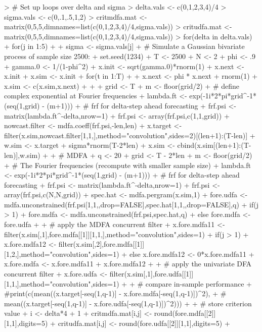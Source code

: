 \documentclass[a4paper]{book}
\begin{document}
\begin{Schunk}
\begin{Sinput}
> # Set up loops over delta and sigma
> delta.vals <- c(0,1,2,3,4)/4
> sigma.vals <- c(0,.1,.5,1,2)
> critmdfa.mat <- matrix(0,5,5,dimnames=list(c(0,1,2,3,4)/4,sigma.vals))
> critudfa.mat <- matrix(0,5,5,dimnames=list(c(0,1,2,3,4)/4,sigma.vals))
> for(delta in delta.vals) {
+ for(j in 1:5) {
+ 
+ sigma <- sigma.vals[j]
+ # Simulate a Gaussian bivariate process of sample size 2500:
+ set.seed(1234)
+ T <- 2500
+ N <- 2
+ phi <- .9
+ gamma.0 <- 1/(1-phi^2)
+ x.init <- sqrt(gamma.0)*rnorm(1)
+ x.next <- x.init
+ x.sim <- x.init
+ for(t in 1:T)
+ {
+ 	x.next <- phi * x.next + rnorm(1)
+ 	x.sim <- c(x.sim,x.next)
+ }
+ 
+ grid <- T
+ m <- floor(grid/2)
+ # define complex exponential at Fourier frequencies
+ lambda.ft <- exp(-1i*2*pi*grid^{-1}*(seq(1,grid) - (m+1)))
+ # frf for delta-step ahead forecasting
+ frf.psi <- matrix(lambda.ft^{-delta},nrow=1) 
+ frf.psi <- array(frf.psi,c(1,1,grid))
+ nowcast.filter <- mdfa.coeff(frf.psi,-len,len)
+ x.target <- filter(x.sim,nowcast.filter[1,1,],method="convolution",sides=2)[(len+1):(T-len)]
+ w.sim <- x.target + sigma*rnorm(T-2*len)
+ x.sim <- cbind(x.sim[(len+1):(T-len)],w.sim)
+ 
+ # MDFA
+ q <- 20
+ grid <- T - 2*len
+ m <- floor(grid/2)
+ # The Fourier frequencies (recompute with smaller sample size)
+ lambda.ft <- exp(-1i*2*pi*grid^{-1}*(seq(1,grid) - (m+1)))
+ # frf for delta-step ahead forecasting
+ frf.psi <- matrix(lambda.ft^{-delta},nrow=1) %
+ frf.psi <- array(frf.psi,c(N,N,grid))
+ spec.hat <- mdfa.pergram(x.sim,1)	
+ fore.udfa <- mdfa.unconstrained(frf.psi[1,1,,drop=FALSE],spec.hat[1,1,,drop=FALSE],q)
+ if(j > 1) { 
+ 	fore.mdfa <- mdfa.unconstrained(frf.psi,spec.hat,q) 
+ } else { fore.mdfa <- fore.udfa }
+   
+ # apply the MDFA concurrent filter
+ x.fore.mdfa11 <- filter(x.sim[,1],fore.mdfa[[1]][1,1,],method="convolution",sides=1)
+ if(j > 1) { 
+ 	x.fore.mdfa12 <- filter(x.sim[,2],fore.mdfa[[1]][1,2,],method="convolution",sides=1) 
+ } else { x.fore.mdfa12 <- 0*x.fore.mdfa11 }
+ x.fore.mdfa <- x.fore.mdfa11 + x.fore.mdfa12 
+ 
+ # apply the univariate DFA concurrent filter
+ x.fore.udfa <- filter(x.sim[,1],fore.udfa[[1]][1,1,],method="convolution",sides=1)
+ 
+ # compare in-sample performance
+ #print(c(mean((x.target[-seq(1,q-1)] - x.fore.mdfa[-seq(1,q-1)])^2),
+ #	mean((x.target[-seq(1,q-1)] - x.fore.udfa[-seq(1,q-1)])^2)))
+ 
+ # store criterion value
+ i <- delta*4 + 1
+ critmdfa.mat[i,j] <- round(fore.mdfa[[2]][1,1],digits=5)
+ critudfa.mat[i,j] <- round(fore.udfa[[2]][1,1],digits=5)
+ }}
\end{Sinput}
\end{Schunk}
\end{document}
